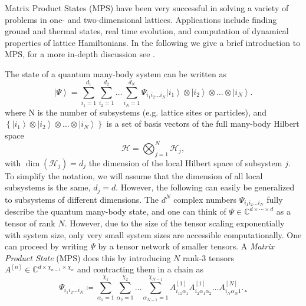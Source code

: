 Matrix Product States (MPS) have been very successful in solving a variety of problems in one- and two-dimensional lattices. Applications include finding ground and thermal states, real time evolution, and computation of dynamical properties of lattice Hamiltonians. In the following we give a brief introduction to MPS, for a more in-depth discussion see \cite{cite:DMRG_in_the_age_of_MPS, cite:practical_introduction_MPS_and_PEPS, cite:tenpy}. \par
The state of a quantum many-body system can be written as
\begin{equation}
	\left|\Psi\right\rangle = \sum_{i_1=1}^{d_1} \sum_{i_2=1}^{d_2} \dots \sum_{i_N=1}^{d_N} \Psi_{i_1i_2\dots i_N} \left|i_1\right\rangle \otimes \left|i_2\right\rangle \otimes \dots \otimes \left|i_N\right\rangle.
\end{equation}
where N is the number of subsystems (e.g. lattice sites or particles), and $\left\{\left|i_1\right\rangle \otimes \left|i_2\right\rangle \otimes \dots \otimes \left|i_N\right\rangle\right\}$ is a set of basis vectors of the full many-body Hilbert space
\begin{equation}
	\mathcal{H} = \bigotimes_{j=1}^{N} \mathcal{H}_j,
\end{equation}
with $\dim\left(\mathcal{H}_j\right) = d_j$ the dimension of the local Hilbert space of subsystem $j$. To simplify the notation, we will assume that the dimension of all local subsystems is the same, $d_j = d$. However, the following can easily be generalized to subsystems of different dimensions. The $d^N$ complex numbers $\Psi_{i_1i_2\dots i_N}$ fully describe the quantum many-body state, and one can think of $\Psi\in\mathbb{C}^{d\times\cdots\times d}$ as a tensor of rank $N$. However, due to the size of the tensor scaling exponentially with system size, only very small system sizes are accessible computationally. One can proceed by writing $\Psi$ by a tensor network of smaller tensors. A \textit{Matrix Product State} (MPS) does this by introducing $N$ rank-3 tensors $A^{[n]}\in\mathbb{C}^{d\times \chi_{n-1}\times \chi_{n}}$ and contracting them in a chain as
\begin{equation}
		\Psi_{i_1i_2\dots i_N} \coloneqq \sum_{\alpha_1=1}^{\chi_1} \sum_{\alpha_2=1}^{\chi_2}\dots\sum_{\alpha_{N-1}=1}^{\chi_{N-1}}
		 A^{[1]}_{i_11\alpha_1} A^{[1]}_{i_2\alpha_1\alpha_2} \dots A^{[N]}_{i_N\alpha_N1}.¸
\end{equation}